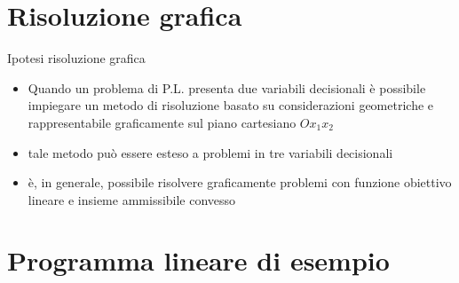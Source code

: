 \documentclass{beamer}
\begin{document}
\generatitolo

\section{Risoluzione grafica}

\begin{frame}{Ipotesi risoluzione grafica}
  \begin{itemize}
  \item Quando un problema di P.L. presenta due variabili decisionali \`e possibile
      impiegare un metodo di risoluzione basato su considerazioni geometriche e 
      rappresentabile graficamente sul piano cartesiano $Ox_1x_2$
  \item tale metodo pu\`o essere esteso a problemi in tre variabili decisionali
  \item \`e, in generale, possibile risolvere graficamente problemi con funzione obiettivo
    lineare e insieme ammissibile convesso
  \end{itemize}
\end{frame}

\section{Programma lineare di esempio}
\end{document}
